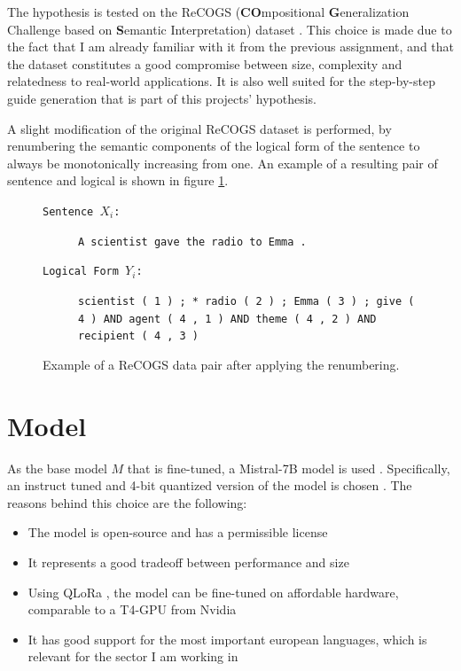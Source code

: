 \documentclass[11pt]{article}
\begin{document}
    The hypothesis is tested on the ReCOGS (\textbf{CO}mpositional \textbf{G}eneralization Challenge based on
    \textbf{S}emantic Interpretation) dataset \cite{wu_recogs_2024, kim_cogs_2020}.
    This choice is made due to the fact that I am already familiar with it from the previous assignment, and that the
    dataset constitutes a good compromise between size, complexity and relatedness to real-world applications.
    It is also well suited for the step-by-step guide generation that is part of this projects' hypothesis.

    A slight modification of the original ReCOGS dataset is performed, by renumbering the semantic components of the
    logical form of the sentence to always be monotonically increasing from one.
    An example of a resulting pair of sentence and logical is shown in figure \ref{fig:recogs_base}.

    \begin{figure}
        \small
        \begin{description}
            \item[\texttt{Sentence $X_i$:}] \texttt{A scientist gave the radio to Emma .}
            \item[\texttt{Logical Form $Y_i$:}] \texttt{scientist ( 1 ) ; * radio ( 2 ) ; Emma ( 3 ) ; give ( 4 ) AND agent ( 4 , 1 ) AND theme ( 4 , 2 ) AND recipient ( 4 , 3 )}
        \end{description}
        \caption{Example of a ReCOGS data pair after applying the renumbering.}
        \label{fig:recogs_base}
    \end{figure}


    \section{Model}\label{S:model}
    As the base model $M$ that is fine-tuned, a Mistral-7B model is used \cite{jiang_mistral_2023}.
    Specifically, an instruct tuned and 4-bit quantized version of the model is chosen \cite{unsloth_unslothmistral-7b-instruct-v02-bnb-4bit_2024}.
    The reasons behind this choice are the following:
    \begin{itemize}
        \item The model is open-source and has a permissible license
        \item It represents a good tradeoff between performance and size
        \item Using QLoRa \cite{dettmers_qlora_2023, hu_lora_2021}, the model can be fine-tuned on affordable hardware, comparable to a T4-GPU from Nvidia
        \item It has good support for the most important european languages, which is relevant for the sector I am working in
    \end{itemize}
\end{document}
